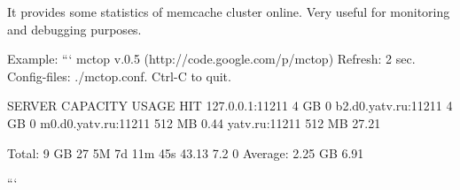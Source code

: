 It provides some statistics of memcache cluster online.
Very useful for monitoring and debugging purposes.

Example:
```
mctop v.0.5 (http://code.google.com/p/mctop)
Refresh: 2 sec. Config-files: ./mctop.conf. Ctrl-C to quit.

SERVER                  CAPACITY        USAGE   HIT %
127.0.0.1:11211         4 GB            0%
b2.d0.yatv.ru:11211     4 GB            0%
m0.d0.yatv.ru:11211     512 MB          0.44%
yatv.ru:11211           512 MB          27.21%

Total:                  9 GB                            27      5M 7d 11m 45s           43.13   7.2     0
Average:                2.25 GB         6.91%

```